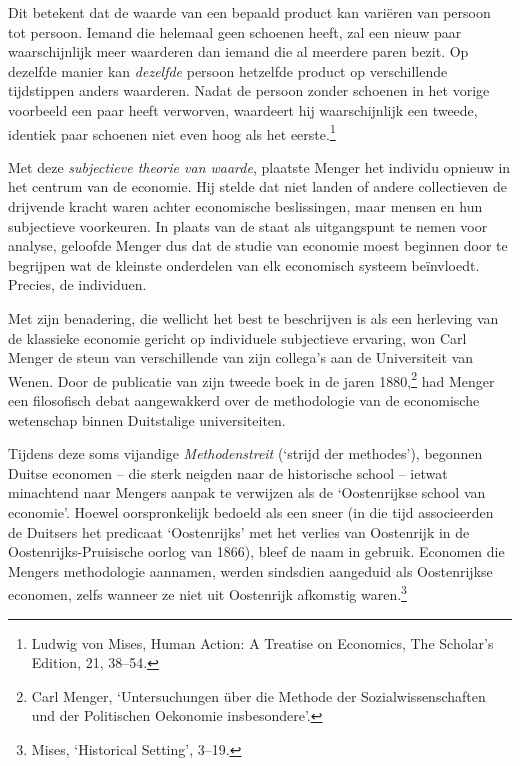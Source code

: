 \documentclass[
  a5paper,
  smalldemyvopaper,11pt,twoside,onecolumn,openright,extrafontsizes]{memoir}
\begin{document}
Dit betekent dat de waarde van een bepaald product kan variëren van
persoon tot persoon. Iemand die helemaal geen schoenen heeft, zal een
nieuw paar waarschijnlijk meer waarderen dan iemand die al meerdere
paren bezit. Op dezelfde manier kan \emph{dezelfde} persoon hetzelfde
product op verschillende tijdstippen anders waarderen. Nadat de persoon
zonder schoenen in het vorige voorbeeld een paar heeft verworven,
waardeert hij waarschijnlijk een tweede, identiek paar schoenen niet
even hoog als het eerste.\footnote{\hspace{0pt}Ludwig von Mises, Human
  Action: A Treatise on Economics, The Scholar's Edition, 21, 38--54.}

Met deze \emph{subjectieve theorie van waarde}, plaatste Menger het
individu opnieuw in het centrum van de economie. Hij stelde dat niet
landen of andere collectieven de drijvende kracht waren achter
economische beslissingen, maar mensen en hun subjectieve voorkeuren. In
plaats van de staat als uitgangspunt te nemen voor analyse, geloofde
Menger dus dat de studie van economie moest beginnen door te begrijpen
wat de kleinste onderdelen van elk economisch systeem beïnvloedt.
Precies, de individuen.

Met zijn benadering, die wellicht het best te beschrijven is als een
herleving van de klassieke economie gericht op individuele subjectieve
ervaring, won Carl Menger de steun van verschillende van zijn collega's
aan de Universiteit van Wenen. Door de publicatie van zijn tweede boek
in de jaren 1880,\footnote{\hspace{0pt}Carl Menger, `Untersuchungen über
  die Methode der Sozialwissenschaften und der Politischen Oekonomie
  insbesondere'.} had Menger een filosofisch debat aangewakkerd over de
methodologie van de economische wetenschap binnen Duitstalige
universiteiten.

Tijdens deze soms vijandige \emph{Methodenstreit} (`strijd der
methodes'), begonnen Duitse economen -- die sterk neigden naar de
historische school -- ietwat minachtend naar Mengers aanpak te verwijzen
als de `Oostenrijkse school van economie'. Hoewel oorspronkelijk bedoeld
als een sneer (in die tijd associeerden de Duitsers het predicaat
`Oostenrijks' met het verlies van Oostenrijk in de
Oostenrijks-Pruisische oorlog van 1866), bleef de naam in gebruik.
Economen die Mengers methodologie aannamen, werden sindsdien aangeduid
als Oostenrijkse economen, zelfs wanneer ze niet uit Oostenrijk
afkomstig waren.\footnote{\hspace{0pt}Mises, `Historical Setting',
  3--19.}
\end{document}
